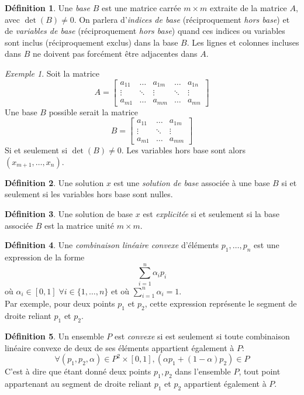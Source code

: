 \documentclass[a4paper]{report}
\theoremstyle{definition}
\newtheorem*{definition}{Définition}
\theoremstyle{remark}
\newtheorem*{example}{Exemple}
\theoremstyle{plain}
\begin{document}
\begin{definition}
Une \emph{base} \(B\) est une matrice carrée \(m\times
m\) extraite de la matrice \(A\), avec \(\det(B)\ne 0\). On parlera
d'\emph{indices de base} (réciproquement \emph{hors base}) et de \emph{variables
de base} (réciproquement \emph{hors base}) quand ces indices ou variables sont
inclus (réciproquement exclus) dans la base \(B\). Les lignes et colonnes
incluses dans \(B\) ne doivent pas forcément être adjacentes dans \(A\).
\begin{example}
Soit la matrice
\[A=\begin{bmatrix}
	a_{11} & \dots  & a_{1m} & \dots  & a_{1n} \\
	\vdots & \ddots & \vdots & \ddots & \vdots \\
	a_{m1} & \dots  & a_{mm} & \dots  & a_{mn}
\end{bmatrix}\]
Une base \(B\) possible serait la matrice
\[B=\begin{bmatrix}
	a_{11} & \dots  & a_{1m} \\
	\vdots & \ddots & \vdots \\
	a_{m1} & \dots  & a_{mm}
\end{bmatrix}\]
Si et seulement si \(\det(B)\neq 0\). Les variables hors base sont alors
\((x_{m+1},\dots,x_{n})\).
\end{example}
\end{definition}

\begin{definition}
Une solution \(x\) est une \emph{solution de base}
associée à une base \(B\) si et seulement si les variables hors base sont
nulles.
\end{definition}

\begin{definition}
Une solution de base \(x\) est \emph{explicitée} si et
seulement si la base associée \(B\) est la matrice unité \(m\times m\).
\end{definition}

\begin{definition}
Une \emph{combinaison linéaire convexe} d'éléments \(p_1,\dots,p_n\) est
une expression de la forme \[\sum_{i=1}^n\alpha_ip_i\] où \(\alpha_i\in[0,1]
\;\forall i\in\{1,\dots,n\}\) et où \(\sum_{i=1}^n\alpha_i=1\). \\
Par exemple, pour deux points \(p_1\) et \(p_2\), cette expression représente le
segment de droite reliant \(p_1\) et \(p_2\).
\end{definition}

\begin{definition}
Un ensemble \(P\) est \emph{convexe} si est seulement si toute combinaison
linéaire convexe de deux de ses éléments appartient également à \(P\):
\[\forall (p_1,p_2,\alpha)\in P^2\times[0,1],(\alpha p_1+(1-\alpha)p_2)\in P\]
C'est à dire que étant donné deux points \(p_1,p_2\) dans l'ensemble \(P\),
tout point appartenant au segment de droite reliant \(p_1\) et \(p_2\)
appartient également à \(P\).
\end{definition}
\end{document}
